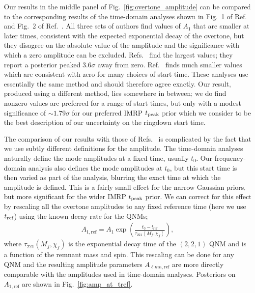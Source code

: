Our results in the middle panel of Fig.~\ref{fig:overtone_amplitude} can be compared to the corresponding results of the time-domain analyses shown in Fig.~1 of Ref.~\cite{Isi:2022mhy} and Fig.~2 of Ref.~\cite{Cotesta:2022pci}.
All three sets of authors find values of $A_1$ that are smaller at later times, consistent with the expected exponential decay of the overtone, but they disagree on the absolute value of the amplitude and the significance with which a zero amplitude can be excluded.
Refs.~\cite{Isi:2019aib, Isi:2022mhy} find the largest values; they report a posterior peaked $3.6\sigma$ away from zero.
Ref.~\cite{Cotesta:2022pci} finds much smaller values which are consistent with zero for many choices of start time.
These analyses use essentially the same method and should therefore agree exactly.
Our result, produced using a different method, lies somewhere in between; we do find nonzero values are preferred for a range of start times, but only with a modest significance of $\sim 1.79\sigma$ for our preferred IMRP $t_{\rm peak}$ prior which we consider to be the best description of our uncertainty on the ringdown start time.

The comparison of our results with those of Refs.~\cite{Isi:2019aib, Cotesta:2022pci, Isi:2022mhy} is complicated by the fact that we use subtly different definitions for the amplitude. 
The time-domain analyses naturally define the mode amplitudes at a fixed time, usually $t_0$.
Our frequency-domain analysis also defines the mode amplitudes at $t_0$, but this start time is then varied as part of the analysis, blurring the exact time at which the amplitude is defined.
This is a fairly small effect for the narrow Gaussian priors, but more significant for the wider IMRP $t_{\rm peak}$ prior.
We can correct for this effect by rescaling all the overtone amplitudes to any fixed reference time (here we use $t_{\rm ref}$) using the known decay rate for the QNMs;
\begin{align}
	A_{1,\mathrm{ref}} = A_1 \exp\left(\frac{t_0-t_{\mathrm{ref}}}{\tau_{221}(M_f,\chi_f)}\right),
\end{align}
where $\tau_{221}(M_f, \chi_f)$ is the exponential decay time of the $(2,2,1)$ QNM and is a function of the remnant mass and spin.
This rescaling can be done for any QNM and the resulting amplitude parameters $A_{\ell m n,\mathrm{ref}}$ are more directly comparable with the amplitudes used in time-domain analyses.
Posteriors on $A_{1,\mathrm{ref}}$ are shown in  
Fig.~\ref{fig:amp_at_tref}.

